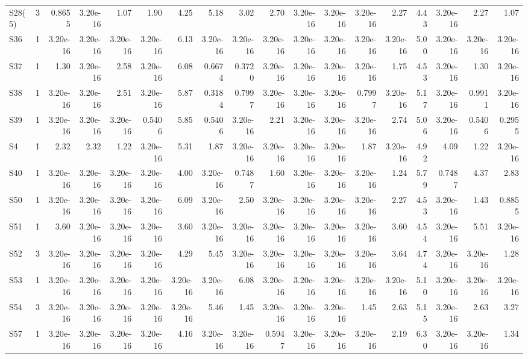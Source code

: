 {\begin{longtable}{lrrrrrrrrrrrrrrrrr}
  S28(5) & 3 & 0.8655 & 3.20e-16 & 1.07 & 1.90 & 4.25 & 5.18 & 3.02 & 2.70 & 3.20e-16 & 3.20e-16 & 3.20e-16 & 2.27 & 4.43 & 3.20e-16 & 2.27 & 1.07 \\
  S36 & 1 & 3.20e-16 & 3.20e-16 & 3.20e-16 & 3.20e-16 & 6.13 & 3.20e-16 & 3.20e-16 & 3.20e-16 & 3.20e-16 & 3.20e-16 & 3.20e-16 & 3.20e-16 & 5.00 & 3.20e-16 & 3.20e-16 & 3.20e-16 \\
  S37 & 1 & 1.30 & 3.20e-16 & 2.58 & 3.20e-16 & 6.08 & 0.6674 & 0.3720 & 3.20e-16 & 3.20e-16 & 3.20e-16 & 3.20e-16 & 1.75 & 4.53 & 3.20e-16 & 1.30 & 3.20e-16 \\
  S38 & 1 & 3.20e-16 & 3.20e-16 & 2.51 & 3.20e-16 & 5.87 & 0.3184 & 0.7997 & 3.20e-16 & 3.20e-16 & 3.20e-16 & 0.7997 & 3.20e-16 & 5.17 & 3.20e-16 & 0.9911 & 3.20e-16 \\
  S39 & 1 & 3.20e-16 & 3.20e-16 & 3.20e-16 & 0.5406 & 5.85 & 0.5406 & 3.20e-16 & 2.21 & 3.20e-16 & 3.20e-16 & 3.20e-16 & 2.74 & 5.06 & 3.20e-16 & 0.5406 & 0.2955 \\
  S4 & 1 & 2.32 & 2.32 & 1.22 & 3.20e-16 & 5.31 & 1.87 & 3.20e-16 & 3.20e-16 & 3.20e-16 & 3.20e-16 & 1.87 & 3.20e-16 & 4.92 & 4.09 & 1.22 & 3.20e-16 \\
  S40 & 1 & 3.20e-16 & 3.20e-16 & 3.20e-16 & 3.20e-16 & 4.00 & 3.20e-16 & 0.7487 & 1.60 & 3.20e-16 & 3.20e-16 & 3.20e-16 & 1.24 & 5.79 & 0.7487 & 4.37 & 2.83 \\
  S50 & 1 & 3.20e-16 & 3.20e-16 & 3.20e-16 & 3.20e-16 & 6.09 & 3.20e-16 & 2.50 & 3.20e-16 & 3.20e-16 & 3.20e-16 & 3.20e-16 & 2.27 & 4.53 & 3.20e-16 & 1.43 & 0.8855 \\
  S51 & 1 & 3.60 & 3.20e-16 & 3.20e-16 & 3.20e-16 & 3.60 & 3.20e-16 & 3.20e-16 & 3.20e-16 & 3.20e-16 & 3.20e-16 & 3.20e-16 & 3.60 & 4.54 & 3.20e-16 & 5.51 & 3.20e-16 \\
  S52 & 3 & 3.20e-16 & 3.20e-16 & 3.20e-16 & 3.20e-16 & 4.29 & 5.45 & 3.20e-16 & 3.20e-16 & 3.20e-16 & 3.20e-16 & 3.20e-16 & 3.64 & 4.74 & 3.20e-16 & 3.20e-16 & 1.28 \\
  S53 & 1 & 3.20e-16 & 3.20e-16 & 3.20e-16 & 3.20e-16 & 3.20e-16 & 3.20e-16 & 6.08 & 3.20e-16 & 3.20e-16 & 3.20e-16 & 3.20e-16 & 3.20e-16 & 5.10 & 3.20e-16 & 3.20e-16 & 3.20e-16 \\
  S54 & 3 & 3.20e-16 & 3.20e-16 & 3.20e-16 & 3.20e-16 & 3.20e-16 & 5.46 & 1.45 & 3.20e-16 & 3.20e-16 & 3.20e-16 & 1.45 & 2.63 & 5.15 & 3.20e-16 & 2.63 & 3.27 \\
  S57 & 1 & 3.20e-16 & 3.20e-16 & 3.20e-16 & 3.20e-16 & 4.16 & 3.20e-16 & 3.20e-16 & 0.5947 & 3.20e-16 & 3.20e-16 & 3.20e-16 & 2.19 & 6.30 & 3.20e-16 & 3.20e-16 & 1.34 \\

\end{longtable}}
